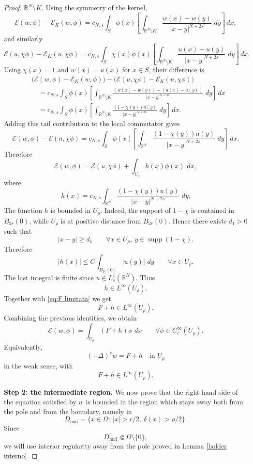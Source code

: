 \documentclass[11pt,a4paper]{article}
\newcommand{\dd}{\,d}
\newcommand{\supp}{\operatorname{supp}}
\begin{document}
\begin{proof}
\(\mathbb R^N\setminus K\). Using the symmetry of the kernel,
\[
\mathcal E(w,\phi)-\mathcal E_K(w,\phi)
=
c_{N,s}
\int_S \phi(x)
\left[
\int_{\mathbb R^N\setminus K}
\frac{w(x)-w(y)}{|x-y|^{N+2s}}\,\dd y
\right]\dd x,
\]
and similarly
\[
\mathcal E(u,\chi\phi)-\mathcal E_K(u,\chi\phi)
=
c_{N,s}
\int_S \chi(x)\phi(x)
\left[
\int_{\mathbb R^N\setminus K}
\frac{u(x)-u(y)}{|x-y|^{N+2s}}\,\dd y
\right]\dd x.
\]
Using \(\chi(x)=1\) and \(w(x)=u(x)\) for \(x\in S\), their difference is
\[
\begin{aligned}
&\bigl(\mathcal E(w,\phi)-\mathcal E_K(w,\phi)\bigr)
-
\bigl(\mathcal E(u,\chi\phi)-\mathcal E_K(u,\chi\phi)\bigr)\\
&\quad=
c_{N,s}
\int_S \phi(x)
\left[
\int_{\mathbb R^N\setminus K}
\frac{(w(x)-w(y))-(u(x)-u(y))}{|x-y|^{N+2s}}\,\dd y
\right]\dd x\\
&\quad=
c_{N,s}
\int_S \phi(x)
\left[
\int_{\mathbb R^N\setminus K}
\frac{(1-\chi(y))u(y)}{|x-y|^{N+2s}}\,\dd y
\right]\dd x.
\end{aligned}
\]
Adding this tail contribution to the local commutator gives
\[
\mathcal E(w,\phi)-\mathcal E(u,\chi\phi)
=
c_{N,s}
\int_S
\phi(x)
\left[
\int_{\mathbb R^N}
\frac{(1-\chi(y))u(y)}
{|x-y|^{N+2s}}\,\dd y
\right]\dd x.
\]
Therefore
\[
\mathcal E(w,\phi)
=
\mathcal E(u,\chi\phi)
+
\int_{U_\rho} h(x)\phi(x)\,\dd x,
\]
where
\[
h(x)
=
c_{N,s}
\int_{\mathbb R^N}
\frac{(1-\chi(y))u(y)}
{|x-y|^{N+2s}}\,\dd y.
\]
The function \(h\) is bounded in \(U_\rho\). Indeed, the support of
\(1-\chi\) is contained in \(B_{2r}(0)\), while \(U_\rho\) is at positive
distance from \(B_{2r}(0)\). Hence there exists \(d_1>0\) such that
\[
|x-y|\ge d_1
\qquad
\forall x \in U_\rho,\ y\in\supp(1-\chi).
\]
Therefore
\[
|h(x)|
\le
C\int_{B_{2r}(0)} |u(y)|\,\dd y
\qquad\forall x \in U_\rho.
\]
The last integral is finite since \(u\in L^1_s(\mathbb R^N)\). Thus
\[
h\in L^\infty(U_\rho).
\]
Together with \eqref{eq:F limitata} we get
\[
F+h\in L^\infty(U_\rho).
\]
Combining the previous identities, we obtain
\[
\mathcal E(w,\phi)
=
\int_{U_\rho} (F+h)\phi\,\dd x
\qquad
\forall \phi\in C_c^\infty(U_\rho).
\]
Equivalently,
\[
(-\Delta)^s w=F+h
\quad\text{in }U_\rho
\]
in the weak sense, with
\[
F+h\in L^\infty(U_\rho).
\]

\medskip
\noindent\textbf{Step 2: the intermediate region.}
We now prove that the right-hand side of the equation satisfied by \(w\) is
bounded in the region which stays away both from the pole and from the
boundary, namely in
\[
D_{\mathrm{mid}}
=
\{x\in\Omega:\ |x|>r/2,\ \delta(x)>\rho/2\}.
\]
Since
\[
\overline{D_{\mathrm{mid}}}\Subset\Omega\setminus\{0\},
\]
we will use interior regularity away from the pole proved in  Lemma \ref{holder interno}.


\end{proof}
\end{document}

